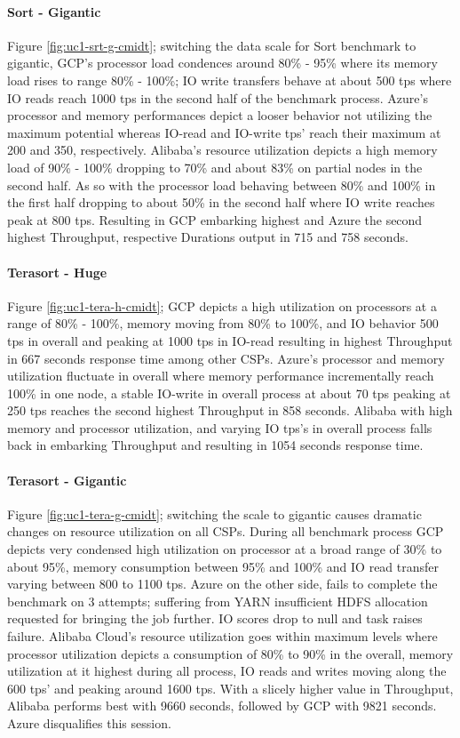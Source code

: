 \documentclass[review]{elsarticle}
\begin{document}
\paragraph{Sort - Gigantic} Figure \ref{fig:uc1-srt-g-cmidt}; switching the data scale for Sort benchmark to gigantic, GCP's processor load condences around 80\% - 95\% where its memory load rises to range 80\% - 100\%; IO write transfers behave at about 500 tps where IO reads reach 1000 tps in the second half of the benchmark process. Azure's processor and memory performances depict a looser behavior not utilizing the maximum potential whereas IO-read and IO-write tps' reach their maximum at 200 and 350, respectively. Alibaba's resource utilization depicts a high memory load of 90\% - 100\% dropping to 70\% and about 83\% on partial nodes in the second half. As so with the processor load behaving between 80\% and 100\% in the first half dropping to about 50\% in the second half where IO write reaches peak at 800 tps. Resulting in GCP embarking highest and Azure the second highest Throughput, respective Durations output in 715 and 758 seconds.

\paragraph{Terasort - Huge} Figure \ref{fig:uc1-tera-h-cmidt}; GCP depicts a high utilization on processors at a range of 80\% - 100\%, memory moving from 80\% to 100\%, and IO behavior 500 tps in overall and peaking at 1000 tps in IO-read resulting in highest Throughput in 667 seconds response time among other CSPs. Azure's processor and memory utilization fluctuate in overall where memory performance incrementally reach 100\% in one node, a stable IO-write in overall process at about 70 tps peaking at 250 tps reaches the second highest Throughput in 858 seconds. Alibaba with high memory and processor utilization, and varying IO tps's in overall process falls back in embarking Throughput and resulting in 1054 seconds response time.

\paragraph{Terasort - Gigantic} Figure \ref{fig:uc1-tera-g-cmidt}; switching the scale to gigantic causes dramatic changes on resource utilization on all CSPs. During all benchmark process GCP depicts very condensed high utilization on processor at a broad range of 30\% to about 95\%, memory consumption between 95\% and 100\% and IO read transfer varying between 800 to 1100 tps. Azure on the other side, fails to complete the benchmark on 3 attempts; suffering from YARN insufficient HDFS allocation requested for bringing the job further. IO scores drop to null and task raises failure. Alibaba Cloud's resource utilization goes within maximum levels where processor utilization depicts a consumption of 80\% to 90\% in the overall, memory utilization at it highest during all process, IO reads and writes moving along the 600 tps' and peaking around 1600 tps. With a slicely higher value in Throughput, Alibaba performs best with 9660 seconds, followed by GCP with 9821 seconds. Azure disqualifies this session.
\end{document}
